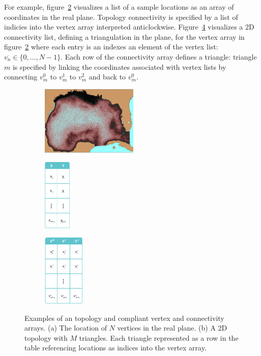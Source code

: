 For example, figure~\ref{fig:xytable} visualizes a list of a sample
locations as an array of coordinates in the real plane. Topology
connectivity is specified by a list of indicies into the vertex array
interpreted anticlockwise. Figure~\ref{fig:vtable} visualizes a 2D
connectivity list, defining a triangulation in the plane, for the
vertex array in figure~\ref{fig:xytable} where each entry is an
indexes an element of the vertex list: $v_n^{\cdot}\in
\{0,\ldots,N-1\}$. Each row of the connectivity array defines a
triangle: triangle $m$ is specified by linking the coordinates
associated with vertex lists by connecting $v^0_m$ to $v^1_m$ to
$v^2_m$ and back to $v^0_m$.
\begin{figure}[ht!]
  \centering
  \begin{subfigure}[t]{0.33\textwidth}
    \centering
    \includegraphics[height=1.3in]{../figs/USF_FVCOM_Hurricane_Ike_2D_final_run_with_waves_topology.png}
    \caption{}
    \label{fig:usf_fvcom_ugrid}
  \end{subfigure}
  \begin{subfigure}[t]{0.32\textwidth}
    \centering
    \includegraphics[height=1.35in]{../figs/xy_table}
    \caption{}
    \label{fig:xytable}
  \end{subfigure}
  \begin{subfigure}[t]{0.32\textwidth}
    \centering
    \includegraphics[height=1.35in]{../figs/v_table}
    \caption{}
    \label{fig:vtable}
  \end{subfigure}
  \caption{Examples of an \ugrid{} topology and \cfugrid compliant
    vertex and connectivity arrays. (a) The location of $N$
    vertices in the real plane. (b) A 2D topology with
    $M$ triangles. Each triangle represented as a row in the table
    referencing locations as indices into the vertex array.}
\end{figure}

